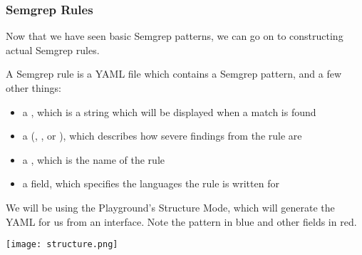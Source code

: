 \documentclass[aspectratio=169, handout]{beamer}
\begin{document}
\begin{frame}[fragile]
  \frametitle{Semgrep Rules}

  \begin{minipage}{0.65\textwidth}
    Now that we have seen basic Semgrep patterns, we can go on to constructing actual Semgrep rules.

    \vspace{5pt}

    A Semgrep rule is a YAML file which contains a Semgrep pattern, and a few other things:
    {\small\begin{itemize}
      \setlength\itemsep{-0.15em}
      \item a , which is a string which will be displayed when a match is found
      \item a  (, , or ), which describes
      how severe findings from the rule are
      \item a , which is the name of the rule
      \item a  field, which specifies the languages the rule is written for
    \end{itemize}
    }

    \vspace{\fill}

    We will be using the Playground's
    Structure Mode, which will generate the YAML for us from an interface. Note the
    pattern in {\color{fgBlue}blue} and other fields in {\color{fgRed}red}.
  \end{minipage}
  \hspace{\fill}
  \begin{minipage}{0.32\textwidth}
    \begin{center}
      \texttt{[image: structure.png]}
    \end{center}
  \end{minipage}
\end{frame}
\end{document}
